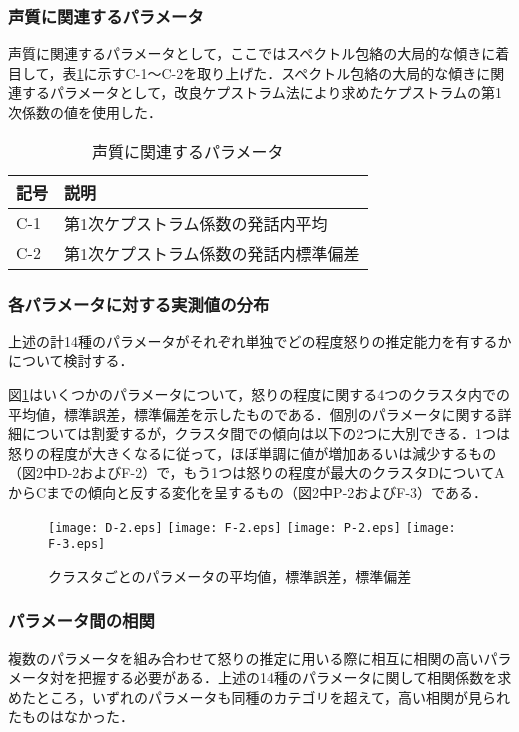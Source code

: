 \documentclass[japanese]{jnlp_1.3c}
\begin{document}
\subsubsection{声質に関連するパラメータ}
声質に関連するパラメータとして，ここではスペクトル包絡の大局的な傾きに着目して，表\ref{tb:cep}に示すC-1〜C-2を取り上げた．スペクトル包絡の大局的な傾きに関連するパラメータとして，改良ケプストラム法により求めたケプストラムの第1次係数の値を使用した．

\begin{table}[b] 
\caption{声質に関連するパラメータ}
\label{tb:cep}
\begin{center}
\begin{tabular}{ll}
\hline
記号&説明 \\ \hline
C-1&第1次ケプストラム係数の発話内平均 \\
C-2&第1次ケプストラム係数の発話内標準偏差 \\ \hline
\end{tabular}
\end{center}
\end{table}
 
\subsubsection{各パラメータに対する実測値の分布}
上述の計14種のパラメータがそれぞれ単独でどの程度怒りの推定能力を有するかについて検討する．

図\ref{fig:graph}はいくつかのパラメータについて，怒りの程度に関する4つのクラスタ内での平均値，標準誤差，標準偏差を示したものである．個別のパラメータに関する詳細については割愛するが，クラスタ間での傾向は以下の2つに大別できる．1つは怒りの程度が大きくなるに従って，ほぼ単調に値が増加あるいは減少するもの（図2中D-2およびF-2）で，もう1つは怒りの程度が最大のクラスタDについてAからCまでの傾向と反する変化を呈するもの（図2中P-2およびF-3）である．

\begin{figure}[t]
\begin{center}
    \texttt{[image: D-2.eps]}
    \texttt{[image: F-2.eps]}
    \texttt{[image: P-2.eps]}
    \texttt{[image: F-3.eps]}
\caption{クラスタごとのパラメータの平均値，標準誤差，標準偏差}
\label{fig:graph}
\end{center} 
\end{figure} 

\subsubsection{パラメータ間の相関}
複数のパラメータを組み合わせて怒りの推定に用いる際に相互に相関の高いパラメータ対を把握する必要がある．上述の14種のパラメータに関して相関係数を求めたところ，いずれのパラメータも同種のカテゴリを超えて，高い相関が見られたものはなかった．
\end{document}
